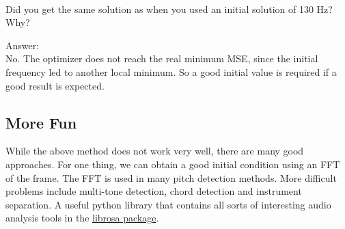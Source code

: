 \documentclass[11pt]{article}
\begin{document}
    \begin{center}
    \end{center}
    { \hspace*{\fill} \\}
    
    Did you get the same solution as when you used an initial solution of
130 Hz? Why?

    Answer:\\
No. The optimizer does not reach the real minimum MSE, since the initial
frequency led to another local minimum. So a good initial value is
required if a good result is expected.

    \subsection{More Fun}\label{more-fun}

While the above method does not work very well, there are many good
approaches. For one thing, we can obtain a good initial condition using
an FFT of the frame. The FFT is used in many pitch detection methods.
More difficult problems include multi-tone detection, chord detection
and instrument separation. A useful python library that contains all
sorts of interesting audio analysis tools in the
\href{https://librosa.github.io/librosa/}{librosa package}.


    
    
    
    
\end{document}
